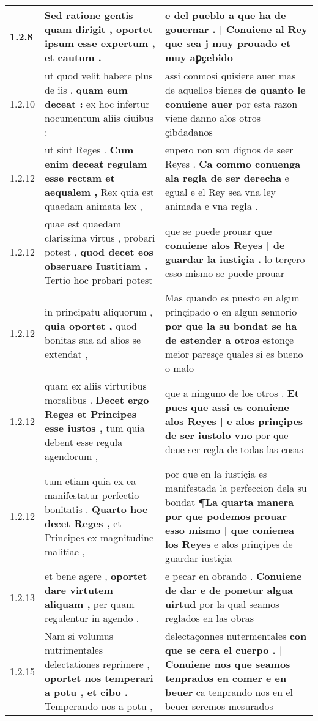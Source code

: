 \begin{tabular}{|p{1cm}|p{6.5cm}|p{6.5cm}|}
1.2.8 & Sed ratione gentis quam dirigit , \textbf{ oportet ipsum esse expertum , } et cautum . & e del pueblo \textbf{ a que ha de gouernar . | Conuiene al Rey } que sea j muy prouado et muy aꝑçebido \\\hline
1.2.10 & ut quod velit habere plus de iis , \textbf{ quam eum deceat : } ex hoc infertur nocumentum aliis ciuibus : & assi conmosi quisiere auer mas de aquellos bienes \textbf{ de quanto le conuiene auer } por esta razon viene danno alos otros çibdadanos \\\hline
1.2.12 & ut sint Reges . \textbf{ Cum enim deceat regulam esse rectam et aequalem , } Rex quia est quaedam animata lex , & enpero non son dignos de seer Reyes . \textbf{ Ca commo conuenga ala regla de ser derecha } e egual e el Rey sea vna ley animada e vna regla . \\\hline
1.2.12 & quae est quaedam clarissima virtus , probari potest , \textbf{ quod decet eos obseruare Iustitiam . } Tertio hoc probari potest & que se puede prouar \textbf{ que conuiene alos Reyes | de guardar la iustiçia . } lo terçero esso mismo se puede prouar \\\hline
1.2.12 & in principatu aliquorum , \textbf{ quia oportet , } quod bonitas sua ad alios se extendat , & Mas quando es puesto en algun prinçipado o en algun sennorio \textbf{ por que la su bondat se ha de estender a otros } estonçe meior paresçe quales si es bueno o malo \\\hline
1.2.12 & quam ex aliis virtutibus moralibus . \textbf{ Decet ergo Reges et Principes esse iustos , } tum quia debent esse regula agendorum , & que a ninguno de los otros . \textbf{ Et pues que assi es conuiene alos Reyes | e alos prinçipes de ser iustolo vno } por que deue ser regla de todas las cosas \\\hline
1.2.12 & tum etiam quia ex ea manifestatur perfectio bonitatis . \textbf{ Quarto hoc decet Reges , } et Principes ex magnitudine malitiae , & por que en la iustiçia es manifestada la perfeccion dela su bondat \textbf{ ¶La quarta manera por que podemos prouar esso mismo | que conienea los Reyes } e alos prinçipes de guardar iustiçia \\\hline
1.2.13 & et bene agere , \textbf{ oportet dare virtutem aliquam , } per quam regulentur in agendo . & e pecar en obrando . \textbf{ Conuiene de dar e de ponetur algua uirtud } por la qual seamos reglados en las obras \\\hline
1.2.15 & Nam si volumus nutrimentales delectationes reprimere , \textbf{ oportet nos temperari a potu , et cibo . } Temperando nos a potu , & delectaçonnes nutermentales \textbf{ con que se cera el cuerpo . | Conuiene nos que seamos tenprados en comer e en beuer } ca tenprando nos en el beuer seremos mesurados \\\hline

\end{tabular}
